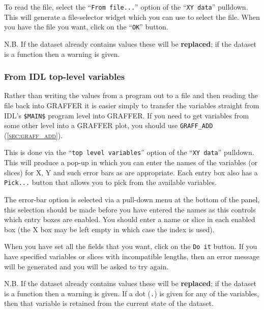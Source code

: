 \documentclass[11pt,twoside,english]{article}
\begin{document}
To read the file, select the {}``\texttt{From file...}'' option of the
{}``\texttt{XY data}'' pulldown. This will generate a file-selector
widget which you can use to select the file. When you have the file you
want, click on the {}``\texttt{OK}'' button.

N.B. If the dataset already contains values these will be
\textbf{replaced}; if the dataset is a function then a warning is
given.


\subsubsection{From IDL top-level variables }

Rather than writing the values from a program out to a file and then
reading the file back into GRAFFER it is easier simply to transfer the
variables straight from IDL's \texttt{\$MAIN\$} program level into
GRAFFER. If you need to get variables from some other level into a
GRAFFER plot, you should use \texttt{GRAFF\_ADD}
(\textsc{\autoref{sec:graff_add}}). 

This is done via the {}``\texttt{top level variables}'' option of the
{}``\texttt{XY data}'' pulldown. This will produce a pop-up in which
you can enter the names of the variables (or slices) for X, Y and such
error bars as are appropriate. Each entry box also has a
\texttt{Pick...} button that allows you to pick from the available
variables.

The error-bar option is selected via a pull-down menu at the bottom of
the panel, this selection should be made before you have entered the
names as this controls which entry boxes are enabled. You should enter
a name or slice in each enabled box (the X box may be left empty in
which case the index is used).

When you have set all the fields that you want, click on the \texttt{Do
  it} button. If you have specified variables or slices with
incompatible lengths, then an error message will be generated and you
will be asked to try again.

N.B. If the dataset already contains values these will be
\textbf{replaced}; if the dataset is a function then a warning is
given. If a dot (\texttt{.}) is given for any of the variables, then
that variable is retained from the current state of the dataset.
\end{document}
